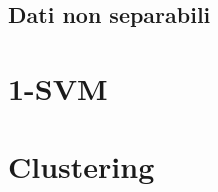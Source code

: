 \documentclass [11pt,a4paper,twoside,openright] {book}
\begin{document}
\subsection{Dati non separabili}

\section{1-SVM}

\section{Clustering}



\end{document}
